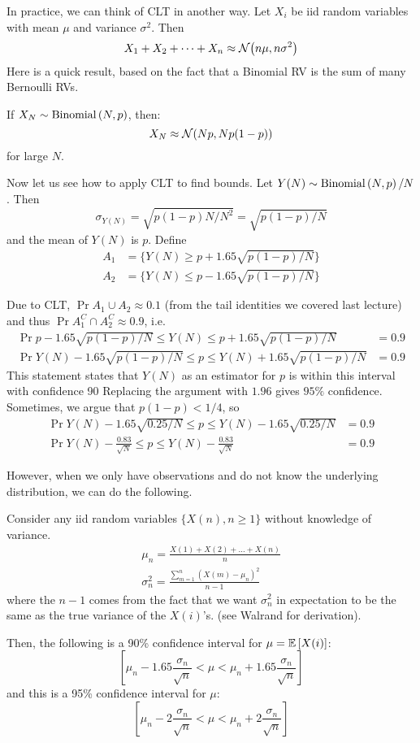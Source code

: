 In practice, we can think of CLT in another way. Let $X_i$ be iid random variables with mean $\mu$ and variance $\sigma^2$. Then
\[ X_1 + X_2 + \dots + X_n \approx \mathcal{N}\qty(n \mu, n \sigma^2)\]
Here is a quick result, based on the fact that a Binomial RV is the sum of many Bernoulli RVs.

\begin{theorem}
    If $X_N \sim \text{Binomial}\left( N, p \right)$, then:
    \[ X_N \approx \mathcal{N}\qty(Np, Np(1- p)) \]
    for large $N$.
\end{theorem}

Now let us see how to apply CLT to find bounds. Let $Y(N) \sim \text{Binomial}\left( N, p \right)/N$. Then 
\[\sigma_{Y(N)} = \sqrt{p(1 - p)N/N^2} = \sqrt{p(1-p)/N}\] and
the mean of $Y(N)$ is $p$. Define
\begin{align*}
    A_1 &= \{ Y(N) \geq p + 1.65 \sqrt{p(1-p)/N} \} \\
    A_2 &= \{ Y(N) \leq p - 1.65 \sqrt{p(1-p)/N} \}
\end{align*}

Due to CLT, $\Pr{A_1 \cup A_2} \approx 0.1$ (from the tail identities we covered last lecture) and thus $\Pr{A_1^C \cap A_2^C} \approx 0.9$, i.e.
\begin{align*}
    \Pr{p - 1.65 \sqrt{p(1-p)/N} \leq Y(N) \leq p + 1.65 \sqrt{p(1-p)/N}} &= 0.9 \\
    \Pr{Y(N)- 1.65 \sqrt{p(1-p)/N} \leq p \leq Y(N) + 1.65 \sqrt{p(1-p)/N}} &= 0.9
\end{align*}
This statement states that $Y(N)$ as an estimator for $p$ is within this interval with confidence 90%
Replacing the argument with $1.96$ gives $95\%$ confidence. Sometimes,
we argue that $p(1-p) < 1/4$, so 
\begin{align*}
    \Pr{Y(N)- 1.65 \sqrt{0.25/N} \leq p \leq Y(N) - 1.65 \sqrt{0.25/N}} &= 0.9 \\
    \Pr{Y(N)- \frac{0.83}{\sqrt{N}} \leq p \leq Y(N) - \frac{0.83}{\sqrt{N}}} &= 0.9
\end{align*} 

However, when we only have observations and do not know the underlying distribution, we can do the following.

\begin{note}
    Consider any iid random variables $\{X(n), n \geq 1\}$ without knowledge of variance.
    \begin{align*}
        \mu_n = \frac{X(1) + X(2) + \dots + X(n)}{n} \\
        \sigma_n^2 = \frac{\sum_{m = 1}^n (X(m) - \mu_n)^2}{n - 1}
    \end{align*}
    where the $n - 1$ comes from the fact that we want $\sigma_n^2$ in expectation to be the same as the
    true variance of the $X(i)$'s.
    (see Walrand for derivation).

    Then, the following is a 90\% confidence interval for $\mu = \mathbb{E}\left[ X(i) \right]$:
    \[ [\mu_n - 1.65 \frac{\sigma_n}{\sqrt{n}} < \mu < \mu_n + 1.65 \frac{\sigma_n}{\sqrt{n}}] \]
    and this is a 95\% confidence interval for $\mu$:
    \[ [\mu_n - 2\frac{\sigma_n}{\sqrt{n}} < \mu < \mu_n + 2\frac{\sigma_n}{\sqrt{n}}] \]
\end{note}
